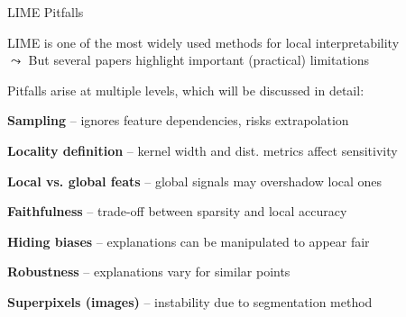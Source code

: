 \documentclass[10pt,compress,t,notes=noshow, xcolor=table]{beamer}
\begin{document}







\begin{framei}[align=top]{LIME Pitfalls}
\item %
LIME is one of the most widely used methods for local interpretability\\
$\leadsto$ But several papers highlight important (practical) limitations
\item Pitfalls arise at multiple levels, which will be discussed in detail:
\begin{itemizeS}
\item \textbf{Sampling} -- ignores feature dependencies, risks extrapolation
\item \textbf{Locality definition} -- kernel width and dist. metrics affect sensitivity
\item \textbf{Local vs. global feats} -- global signals may overshadow local ones
\item \textbf{Faithfulness} -- trade-off between sparsity and local accuracy
\item \textbf{Hiding biases} -- explanations can be manipulated to appear fair
\item \textbf{Robustness} -- explanations vary for similar points
\item \textbf{Superpixels (images)} -- instability due to segmentation method
\end{itemizeS}
\end{framei}
\end{document}
